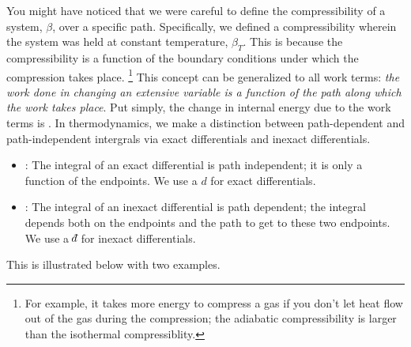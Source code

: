 \documentclass[12pt]{article}
\def\dbar{{\mathchar'26\mkern-12mu d}}
\begin{document}
You might have noticed that we were careful to define the compressibility of a system, $\beta$, over a specific path. Specifically, we defined a compressibility wherein the system was held at constant temperature, $\beta_T$. This is because the compressibility is a function of the boundary conditions under which the compression takes place. \footnote{For example, it takes more energy to compress a gas if you don't let heat flow out of the gas during the compression; the adiabatic compressibility is larger than the isothermal compressiblity.} This concept can be generalized to all work terms: \emph{the work done in changing an extensive variable is a function of the path along which the work takes place}. Put simply, the change in internal energy due to the work terms is . In thermodynamics, we make a distinction between path-dependent and path-independent intergrals via exact differentials and inexact differentials. 
\begin{itemize}
\item {}: The integral of an exact differential is path independent; it is only a function of the endpoints. We use a $d$ for exact differentials.
\item {}: The integral of an inexact differential is path dependent; the integral depends both on the endpoints and the path to get to these two endpoints. We use a $\dbar$ for inexact differentials.
\end{itemize}
This is illustrated below with two examples.
\end{document}
